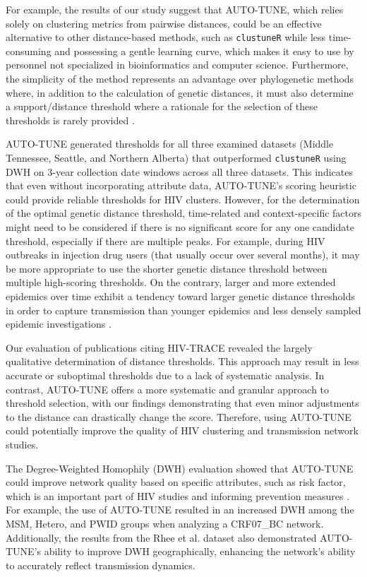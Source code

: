\documentclass[utf8]{FrontiersinHarvard} %
\begin{document}
For example, the results of our study suggest that AUTO-TUNE, which relies
solely on clustering metrics from pairwise distances, could be an effective
alternative to other distance-based methods, such as {\tt clustuneR} while less
time-consuming and possessing a gentle learning curve, which makes it easy to
use by personnel not specialized in bioinformatics and computer science.
Furthermore, the simplicity of the method represents an advantage over
phylogenetic methods where, in addition to the calculation of genetic
distances, it must also determine a support/distance threshold where a
rationale for the selection of these thresholds is rarely provided
\citep{junqueira_factors_2019}.

AUTO-TUNE generated thresholds for all three examined datasets (Middle
Tennessee, Seattle, and Northern Alberta) that outperformed {\tt clustuneR}
using DWH on 3-year collection date windows across all three datasets. This
indicates that even without incorporating attribute data, AUTO-TUNE's scoring
heuristic could provide reliable thresholds for HIV clusters. However, for the
determination of the optimal genetic distance threshold, time-related and
context-specific factors might need to be considered if there is no significant
score for any one candidate threshold, especially if there are multiple peaks.
For example, during HIV outbreaks in injection drug users (that usually occur
over several months), it may be more appropriate to use the shorter genetic
distance threshold \citep{peters_hiv_2016,campbell_detailed_2017} between
multiple high-scoring thresholds. On the contrary, larger and more extended
epidemics over time exhibit a tendency toward larger genetic distance
thresholds in order to capture transmission than younger epidemics and less
densely sampled epidemic investigations
\citep{patil_exploring_2022,leung_molecular_2019,di_giallonardo_subtype-specific_2021}.

Our evaluation of publications citing HIV-TRACE revealed the largely
qualitative determination of distance thresholds. This approach may result in
less accurate or suboptimal thresholds due to a lack of systematic analysis. In
contrast, AUTO-TUNE offers a more systematic and granular approach to threshold
selection, with our findings demonstrating that even minor adjustments to the
distance can drastically change the score. Therefore, using AUTO-TUNE could
potentially improve the quality of HIV clustering and transmission network
studies.

The Degree-Weighted Homophily (DWH) evaluation showed that AUTO-TUNE could
improve network quality based on specific attributes, such as risk factor,
which is an important part of HIV studies and informing prevention measures
\citep{potterat_risk_2002,fujimoto_methodological_2021}. For example, the use of
AUTO-TUNE resulted in an increased DWH among the MSM, Hetero, and PWID groups
when analyzing a CRF07\_BC network. Additionally, the results from the Rhee et
al. dataset also demonstrated AUTO-TUNE's ability to improve DWH
geographically, enhancing the network's ability to accurately reflect
transmission dynamics.
\end{document}
